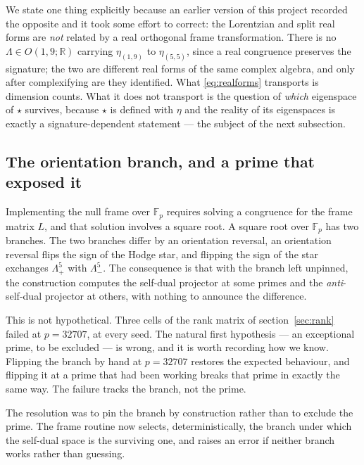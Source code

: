 \documentclass[11pt,a4paper]{article}
\theoremstyle{definition}
\theoremstyle{remark}
\newcommand{\Fp}{\mathbb{F}_p}
\begin{document}
We state one thing explicitly because an earlier version of this project recorded
the opposite and it took some effort to correct: the Lorentzian and split real
forms are \emph{not} related by a real orthogonal frame transformation. There is
no $\Lambda \in O(1,9;\mathbb{R})$ carrying $\eta_{(1,9)}$ to $\eta_{(5,5)}$,
since a real congruence preserves the signature; the two are different real forms
of the same complex algebra, and only after complexifying are they identified.
What \eqref{eq:realforms} transports is dimension counts. What it does not
transport is the question of \emph{which} eigenspace of $\star$ survives, because
$\star$ is defined with $\eta$ and the reality of its eigenspaces is exactly a
signature-dependent statement --- the subject of the next subsection.

\subsection{The orientation branch, and a prime that exposed it}
\label{sec:orientation}

Implementing the null frame over $\Fp$ requires solving a congruence for the
frame matrix $L$, and that solution involves a square root. A square root over
$\Fp$ has two branches. The two branches differ by an orientation reversal, an
orientation reversal flips the sign of the Hodge star, and flipping the sign of
the star exchanges $\Lambda^5_+$ with $\Lambda^5_-$. The consequence is that with
the branch left unpinned, the construction computes the self-dual projector at
some primes and the \emph{anti}-self-dual projector at others, with nothing to
announce the difference.

This is not hypothetical. Three cells of the rank matrix of
section~\ref{sec:rank} failed at $p = 32707$, at every seed. The natural first
hypothesis --- an exceptional prime, to be excluded --- is wrong, and it is worth
recording how we know. Flipping the branch by hand at $p = 32707$ restores the
expected behaviour, and flipping it at a prime that had been working breaks that
prime in exactly the same way. The failure tracks the branch, not the prime.

The resolution was to pin the branch by construction rather than to exclude the
prime. The frame routine now selects, deterministically, the branch under which
the self-dual space is the surviving one, and raises an error if neither branch
works rather than guessing.
\end{document}
